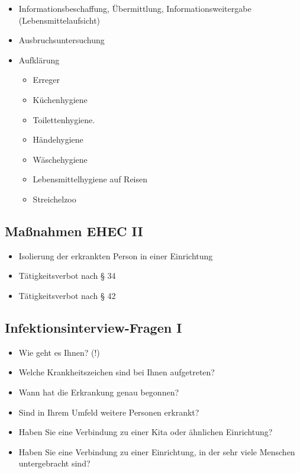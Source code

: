 \documentclass[
]{article}
\providecommand{\tightlist}{%
  \setlength{\itemsep}{0pt}\setlength{\parskip}{0pt}}
\begin{document}
\begin{itemize}
\tightlist
\item
  Informationsbeschaffung, Übermittlung, Informationsweitergabe
  (Lebensmittelaufsicht)
\item
  Ausbruchsuntersuchung
\item
  Aufklärung

  \begin{itemize}
  \tightlist
  \item
    Erreger
  \item
    Küchenhygiene
  \item
    Toilettenhygiene.
  \item
    Händehygiene
  \item
    Wäschehygiene
  \item
    Lebensmittelhygiene auf Reisen
  \item
    Streichelzoo
  \end{itemize}
\end{itemize}

\hypertarget{mauxdfnahmen-ehec-ii}{%
\subsection{Maßnahmen EHEC II}\label{mauxdfnahmen-ehec-ii}}

\begin{itemize}
\tightlist
\item
  Isolierung der erkrankten Person in einer Einrichtung
\item
  Tätigkeitsverbot nach § 34
\item
  Tätigkeitsverbot nach § 42
\end{itemize}

\hypertarget{infektionsinterview-fragen-i}{%
\subsection{Infektionsinterview-Fragen
I}\label{infektionsinterview-fragen-i}}

\begin{itemize}
\tightlist
\item
  Wie geht es Ihnen? (!)
\item
  Welche Krankheitszeichen sind bei Ihnen aufgetreten?
\item
  Wann hat die Erkrankung genau begonnen?
\item
  Sind in Ihrem Umfeld weitere Personen erkrankt?
\item
  Haben Sie eine Verbindung zu einer Kita oder ähnlichen Einrichtung?
\item
  Haben Sie eine Verbindung zu einer Einrichtung, in der sehr viele
  Menschen untergebracht sind?
\end{itemize}
\end{document}
